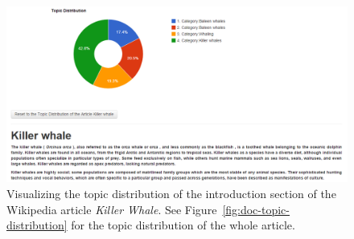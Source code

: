 \begin{figure}[htb]\centering 
\includegraphics[width=1\textwidth]{images/para_topic_distribution.png}
\caption{Visualizing the topic distribution of the introduction 
section of the Wikipedia article \textit{Killer Whale}. See Figure~\ref{fig:doc-topic-distribution} for the topic distribution of 
the whole article.}
\label{fig:doc-para-viz}
\end{figure}



